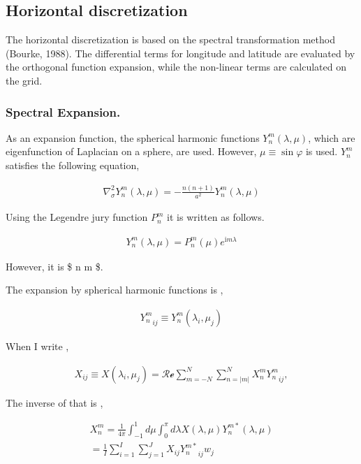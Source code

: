 \hypertarget{horizontal-discretization}{%
\subsection{Horizontal discretization}\label{horizontal-discretization}}

The horizontal discretization is based on the spectral transformation
method (Bourke, 1988). The differential terms for longitude and latitude
are evaluated by the orthogonal function expansion, while the non-linear
terms are calculated on the grid.

\hypertarget{spectral-expansion.}{%
\subsubsection{Spectral Expansion.}\label{spectral-expansion.}}

As an expansion function, the spherical harmonic functions
\(Y_n^m(\lambda,\mu)\), which are eigenfunction of Laplacian on a
sphere, are used. However, \(\mu \equiv \sin\varphi\) is used. \(Y_n^m\)
satisfies the following equation,

\begin{eqnarray}
\nabla^{2}_{\sigma} Y_n^m(\lambda,\mu) 
= - \frac{n(n+1)}{a^{2}} Y_n^m(\lambda,\mu) 
\end{eqnarray}

Using the Legendre jury function \(P_n^m\) it is written as follows.

\begin{eqnarray}
Y_n^m(\lambda,\mu) = P_n^m (\mu) e^{\mathrm{i}m \lambda}
\end{eqnarray}

However, it is \$ n \geq \textbar{} m \textbar{} \$.

The expansion by spherical harmonic functions is ,

\begin{eqnarray}
   {Y_n^m}_{ij} \equiv Y_n^m ( \lambda_i, \mu_j )
\end{eqnarray}

When I write ,

\begin{eqnarray}
  X_{ij} \equiv X ( \lambda_i, \mu_j )
   =  \mathcal{Re} \sum_{m=-N}^{N} \sum_{n=|m|}^{N} 
        X_n^m {Y_n^m}_{ij} ,
\end{eqnarray}

The inverse of that is ,

\begin{eqnarray}
  X_n^m 
         =  \frac{1}{4 \pi} 
             \int_{-1}^{1} d \mu \int_{0}^{\pi} d \lambda 
               X( \lambda, \mu ) Y_n^{m *} ( \lambda, \mu ) \\
         =  \frac{1}{I} \sum_{i=1}^{I} \sum_{j=1}^{J}  
               X_{ij} {Y_n^{m*}}_{ij} w_j 
\end{eqnarray}

